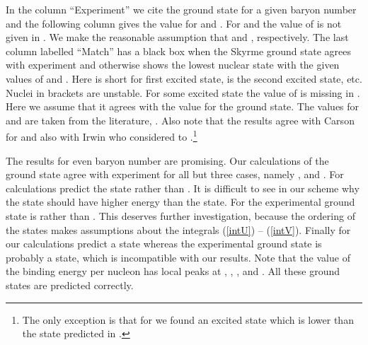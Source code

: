\documentclass[a4paper,12pt]{article}
\begin{document}
In the column ``Experiment'' we cite the ground state 
for a given baryon number and the following column gives the value for \coordHE{} and 
\coordHE{}. For \coordHE{} and \coordHE{} the value of \coordHE{} is not given in 
\cite{tableofisotopes:1996}. We make the reasonable assumption that 
\coordHE{} and \coordHE{}, respectively.
%
The last column labelled ``Match'' has a black box when the Skyrme ground
state agrees with experiment and otherwise shows the lowest nuclear 
state with the given values of \coordHE{} and \coordHE{}. Here \myHighlight{$*$}\coordHE{} is short for first 
excited state, \myHighlight{$**$}\coordHE{} is the second excited state, etc. Nuclei in brackets 
are unstable. For some excited state the value of \coordHE{} is missing in 
\cite{tableofisotopes:1996}.
Here we assume that it agrees with the value for the ground state.
The values for \coordHE{} and \coordHE{} are taken from the literature, 
\cite{Adkins:1983ya, Braaten:1988cc}. Also note that the results agree 
with Carson \cite{Carson:1991yv} for \coordHE{} and also 
with Irwin \cite{Irwin:1998bs} who considered \coordHE{} to \coordHE{}.\footnote{The
only exception is that for \coordHE{} we found an excited state 
\myHighlight{$| 0 \rangle | 1 \rangle$}\coordHE{} which is lower than the \myHighlight{$| 2 \rangle | 1 
\rangle$}\coordHE{} state predicted in \cite{Irwin:1998bs}.}

The results for even baryon number are promising. Our calculations of the 
ground state agree with experiment for all but three cases, namely \coordHE{}, \coordHE{} and \coordHE{}. 
%
For \coordHE{} calculations predict the state \myHighlight{$| 1 \rangle | 0 \rangle$}\coordHE{} 
rather 
than \myHighlight{$| 3 \rangle | 0 \rangle$}\coordHE{}. It is difficult to see in our scheme 
why the  \myHighlight{$| 1 \rangle  | 0 \rangle$}\coordHE{} state should have higher energy 
than the \myHighlight{$| 3 \rangle | 0 \rangle$}\coordHE{} state.
%
For \coordHE{} the experimental ground state is \myHighlight{$| 0 \rangle | 1 \rangle$}\coordHE{} 
rather than \myHighlight{$| 1 \rangle | 0 \rangle$}\coordHE{}. 
This deserves further investigation, because the 
ordering of the states makes assumptions about the integrals 
(\ref{intU}) -- (\ref{intV}).
%
Finally for \coordHE{} our calculations predict a \myHighlight{$| 1 \rangle | 0 \rangle$}\coordHE{} 
state whereas the experimental ground state is probably a \myHighlight{$| 0 \rangle | 1 
\rangle$}\coordHE{} state, which is incompatible with our results.
Note that the value of the binding energy per nucleon  has local peaks at
\coordHE{}, \coordHE{}, \coordHE{}, \coordHE{} and \coordHE{}. All these ground states are predicted
correctly.
\end{document}
